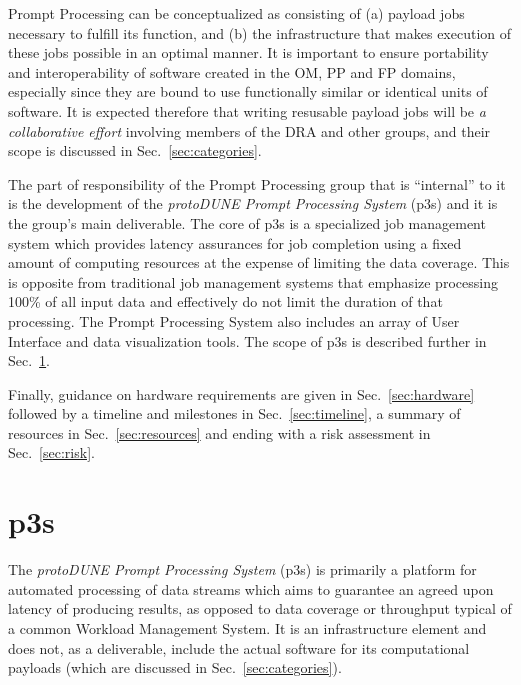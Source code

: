 \documentclass[pdftex,12pt,letter]{article}
\newcommand{\pd}{protoDUNE\xspace}
\begin{document}
Prompt Processing can be conceptualized as consisting of (a) payload
jobs necessary to fulfill its function, and (b) the infrastructure that
makes execution of these jobs possible in an optimal manner.
It is important to ensure portability and
interoperability of software created in the OM, PP and FP domains,
especially since they are bound to use functionally similar or identical
units of software. It is expected therefore that writing resusable payload
jobs will be \textit{a collaborative effort} involving members of the DRA
and other groups, and their  scope is discussed in Sec.~\ref{sec:categories}.

The part of responsibility
of the Prompt Processing group that is ``internal'' to it is the
development of
the \textit{\pd Prompt   Processing System} (p3s) and it is the group's
main deliverable.  The core of 
p3s is a specialized job management system which provides
latency assurances for job completion using a fixed amount of
computing resources at the expense of limiting the data coverage.
This is opposite from traditional job management systems that
emphasize processing 100\% of all input data and effectively do not limit the
duration of that processing. The Prompt Processing System also includes
an array of User Interface and data visualization tools.
The scope of p3s is described further in Sec.~\ref{sec:p3sscope}.

Finally, guidance on hardware requirements are given in
Sec.~\ref{sec:hardware} followed by a timeline and milestones in
Sec.~\ref{sec:timeline}, a summary of resources in
Sec.~\ref{sec:resources} and ending with a risk assessment in
Sec.~\ref{sec:risk}.



\section{p3s}
\label{sec:p3sscope}
The \textit{\pd Prompt Processing System} (p3s) is primarily a
platform for automated processing of data streams which
aims to  guarantee an agreed upon latency of producing results,
as opposed to data coverage or
throughput typical of a common Workload Management System.
It is an infrastructure element and does not, as a
deliverable, include the actual software for its computational
payloads (which are discussed in Sec.~\ref{sec:categories}).
\end{document}
